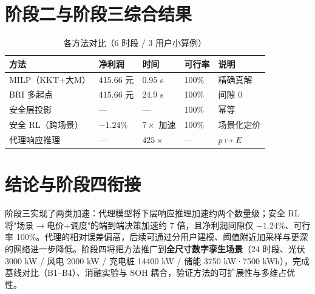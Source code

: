 \documentclass[UTF8,a4paper,11pt]{ctexart}
\begin{document}
\section{阶段二与阶段三综合结果}

\begin{table}[htbp]
\centering
\small
\caption{各方法对比（6 时段 / 3 用户小算例）}
\begin{tabular}{p{2.7cm} p{2.6cm} p{2.6cm} p{2.7cm} p{2.3cm}}
\toprule
\textbf{方法} & \textbf{净利润} & \textbf{时间} & \textbf{可行率} & \textbf{说明}\\
\midrule
MILP（KKT+大M） & 415.66 元 & 0.95 s & 100\% & 精确真解\\
BRI 多起点 & 415.66 元 & 24.9 s & 100\% & 间隙 0\\
安全层投影 & --- & --- & 100\% & 幂等\\
安全 RL（跨场景） & $-1.24\%$ & $7\times$ 加速 & 100\% & 场景化定价\\
代理响应推理 & --- & $425\times$ & --- & $p\mapsto E$\\
\bottomrule
\end{tabular}
\end{table}

\section{结论与阶段四衔接}
阶段三实现了两类加速：代理模型将下层响应推理加速约两个数量级；安全 RL 将"场景$\to$电价+调度"的端到端决策加速约 7 倍，且净利润间隙仅 $-1.24\%$、可行率 100\%。代理的相对误差偏高，后续可通过分用户建模、阈值附近加采样与更深的网络进一步降低。阶段四将把方法推广到\textbf{全尺寸数字孪生场景}（24 时段、光伏 3000 kW / 风电 2000 kW / 充电桩 14400 kW / 储能 3750 kW·7500 kWh），完成基线对比（B1--B4）、消融实验与 SOH 耦合，验证方法的可扩展性与多维占优性。
\end{document}
